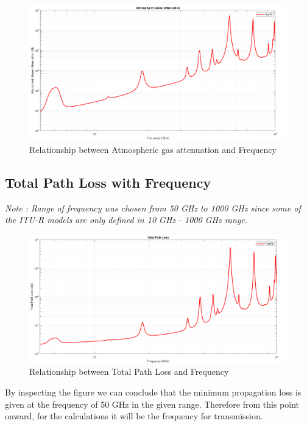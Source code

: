 \documentclass[a4paper,11pt]{article}%
\begin{document}
\begin{figure}[!h]
	\centering
	\includegraphics[scale=0.35]{figures/GasPL.png}
	\caption{Relationship between Atmospheric gas attenuation and Frequency}
\end{figure}


\subsection{Total Path Loss with Frequency}
\textit{Note : Range of frequency was chosen from 50 GHz to 1000 GHz since some of the ITU-R models are only defined in 10 GHz - 1000 GHz range.}
\begin{figure}[!h]
	\centering
	\includegraphics[scale=0.35]{figures/TotalPL.png}
	\caption{Relationship between Total Path Loss and Frequency}
\end{figure}

By inspecting the figure we can conclude that the minimum propagation loss is given at the frequency of 50 GHz in the given range. Therefore from this point onward, for the calculations it will be the frequency for transmission.\\
\end{document}
